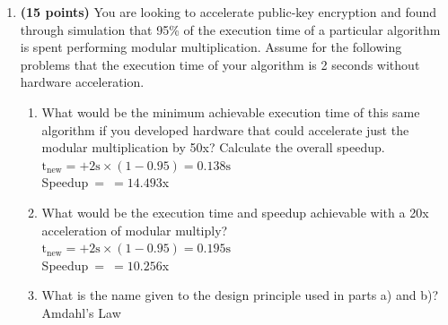 \documentclass[11pt]{article}
\begin{document}

\begin{enumerate}
    \item \textbf{(15 points)} You are looking to accelerate public-key encryption and found through simulation that 95\% of the execution time of a particular algorithm is spent performing modular multiplication. Assume for the following problems that the execution time of your algorithm is 2 seconds without hardware acceleration.
    \begin{enumerate}
        \item What would be the minimum achievable execution time of this same algorithm if you developed hardware that could accelerate just the modular multiplication by 50x? Calculate the overall speedup.\\[1em]
        $\mathrm{t_{new}=}$$+2\mathrm{s}\times (1-0.95)=0.138\mathrm{s}$\\[0.25em]
        Speedup$\ =$$\ =14.493$x\\

        \item What would be the execution time and speedup achievable with a 20x acceleration of modular multiply?\\[1em]
        $\mathrm{t_{new}=}$$+2\mathrm{s}\times (1-0.95)=0.195\mathrm{s}$\\[0.25em]
        Speedup$\ =$$\ =10.256$x\\

        \item What is the name given to the design principle used in parts a) and b)?\\[1em]
        Amdahl's Law\\


\end{enumerate}
\end{enumerate}
\end{document}
